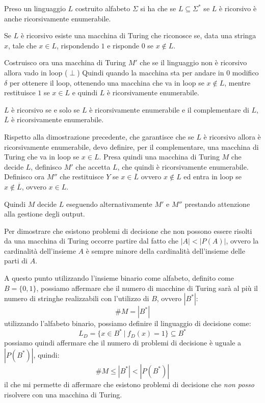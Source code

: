 \begin{teorema}
    Preso un linguaggio $L$ costruito alfabeto $\Sigma$ si ha che se $L \subseteq \Sigma^{\ast}$ se $L$ è ricorsivo è anche ricorsivamente enumerabile.
\end{teorema}
\begin{dimostrazione}
    Se $L$ è ricorsivo esiste una macchina di Turing che riconosce se, data una stringa $x$, tale che $x \in L$, rispondendo $1$ e risponde $0$ se $x \notin L$. 
    
    Costruisco ora una macchina di Turing $M'$ che se il linguaggio non è ricorsivo allora vado in loop ($\perp$) Quindi quando la macchina sta per andare in $0$ modifico $\delta$ per ottenere il loop, ottenendo una macchina che va in loop se $x \notin L$, mentre restituisce $1$ se $x \in L$ e quindi $L$ è ricorsivamente enumerabile.
\end{dimostrazione}

\begin{teorema}
    $L$ è ricorsivo se e solo se $L$ è ricorsivamente enumerabile e il complementare di $L$, $\overline{L}$ è ricorsivamente enumerabile.
\end{teorema}
\begin{dimostrazione}
    Rispetto alla dimostrazione precedente, che garantisce che se $L$ è ricorsivo allora è ricorsivamente enumerabile, devo definire, per il complementare, una macchina di Turing che va in loop se $x \in L$.
    Presa quindi una macchina di Turing $M$ che decide $L$, definisco $M'$ che accetta $L$, che quindi è ricorsivamente enumerabile. Definisco ora $M''$ che restituisce $Y$ se $x \in \overline{L}$ ovvero $x \notin L$ ed entra in loop se $x \notin \overline{L}$, ovvero $x \in L$.
    
    Quindi $M$ decide $L$ eseguendo alternativamente $M'$ e $M''$ prestando attenzione alla gestione degli output.
\end{dimostrazione}

Per dimostrare che esistono problemi di decisione che non possono essere risolti da una macchina di Turing occorre partire dal fatto che $|A| < |P(A)|$, ovvero la cardinalità dell'insieme $A$ è sempre minore della cardinalità dell'insieme delle parti di $A$. 

A questo punto utilizzando l'insieme binario come alfabeto, definito come $B = \{0, 1\}$, possiamo affermare che il numero di macchine di Turing sarà al più il numero di stringhe realizzabili con l'utilizzo di $B$, ovvero $|B^{\ast}|$:
\begin{equation}
    \# M = |B^{\ast}|
\end{equation}
utilizzando l'alfabeto binario, possiamo definire il linguaggio di decisione come:
\begin{equation}
    L_D = \{x \in B^{\ast} \ | \ f_D(x) = 1\} \subseteq B^{\ast}
\end{equation}
possiamo quindi affermare che il numero di problemi di decisione è uguale a $|P(B^{\ast})|$, quindi:
\begin{equation}
    \# M \leq |B^{\ast}| < |P(B^{\ast})|
\end{equation}
il che mi permette di affermare che esistono problemi di decisione che \textit{non posso} risolvere con una macchina di Turing.
